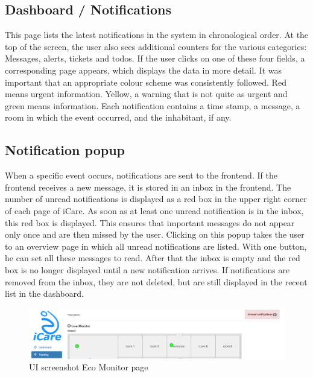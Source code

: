 \subsection{Dashboard / Notifications}

This page lists the latest notifications in the system in chronological order. 
At the top of the screen, the user also sees additional counters for the various categories: Messages, alerts, tickets and todos. If the user clicks on one of these four fields, a corresponding page appears, which displays the data in more detail.
It was important that an appropriate colour scheme was consistently followed.
Red means urgent information. Yellow, a warning that is not quite as urgent and green means information.
Each notification contains a time stamp, a message, a room in which the event occurred, and the inhabitant, if any.

\subsection{Notification popup}

When a specific event occurs, notifications are sent to the frontend. If the frontend receives a new message, it is stored in an inbox in the frontend. The number of unread notifications is displayed as a red box in the upper right corner of each page of iCare. As soon as at least one unread notification is in the inbox, this red box is displayed. This ensures that important messages do not appear only once and are then missed by the user.
Clicking on this popup takes the user to an overview page in which all unread notifications are listed. With one button, he can set all these messages to read. After that the inbox is empty and the red box is no longer displayed until a new notification arrives.
If notifications are removed from the inbox, they are not deleted, but are still displayed in the recent list in the dashboard.



\begin{figure}[H]
	\centering
	\includegraphics[width =1\textwidth]{images/uiNotificationPopup.png}
	\caption{UI screenshot Eco Monitor  page}
\end{figure}


